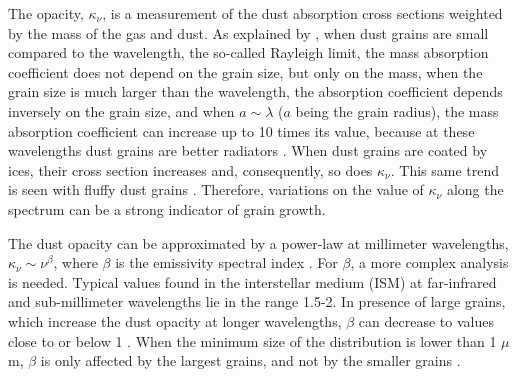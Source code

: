 \documentclass{aa}
\begin{document}
The opacity, $\kappa_{\nu}$, is a measurement of the dust absorption cross sections weighted by the mass of the gas and dust. As explained by , when dust grains are small compared to the wavelength, the so-called Rayleigh limit, the mass absorption coefficient does not depend on the grain size, but only on the mass, when the grain size is much larger than the wavelength, the absorption coefficient depends inversely on the grain size, and when $ a\sim\lambda$ ($a$ being the grain radius), the mass absorption coefficient can increase up to 10 times its value, because at these wavelengths dust grains are better radiators . When dust grains are coated by ices, their cross section increases and, consequently, so does $\kappa_{\nu}$. This same trend is seen with fluffy dust grains . Therefore, variations on the value of $\kappa_{\nu}$ along the spectrum can be a strong indicator of grain growth. 

The dust opacity can be approximated by a power-law at millimeter wavelengths, $\kappa_{\nu}\sim\nu ^{\beta}$, where $\beta$ is the emissivity spectral index . For $\beta$, a more complex analysis is needed. Typical values found in the interstellar medium (ISM) at far-infrared and sub-millimeter wavelengths lie in the range 1.5-2. In presence of large grains, which increase the dust opacity at longer wavelengths, $\beta$ can decrease to values close to or below 1 . When the minimum size of the distribution is lower than 1 $\mu$m, $\beta$ is only affected by the largest grains, and not by the smaller grains . 
\end{document}
